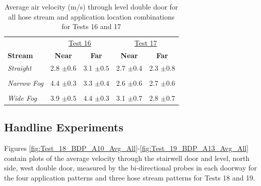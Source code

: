 \documentclass[12pt,oneside]{book}
\begin{document}
\begin{table}[!ht]
\caption{Average air velocity (m/s) through  level double door for all hose stream and application location combinations for Tests 16 and 17}
\begin{tabular}{lcccc}
\toprule
 & \multicolumn{2}{c}{\underline{Test 16}} & \multicolumn{2}{c}{\underline{Test 17}}
\\
\textbf{Stream} & \textbf{Near} & \textbf{Far} & \textbf{Near} & \textbf{Far} \\
\midrule
\textit{Straight} & 
2.8 $\pm 0.6$ & 3.1 $\pm 0.5$ & 
2.7 $\pm 0.4$ & 2.3 $\pm 0.8$
\\	\multicolumn{5}{c}{}	\\
\textit{Narrow Fog} & 
4.4 $\pm 0.3$ & 3.3 $\pm 0.4$ & 
2.6 $\pm 0.6$ & 2.7 $\pm 0.6$
\\	\multicolumn{5}{c}{}	\\
\textit{Wide Fog} 	& 
3.9 $\pm 0.5$ & 4.4 $\pm 0.3$ & 
3.1 $\pm 0.7$ & 2.8 $\pm 0.7$ 
\\ 
\bottomrule
\end{tabular}
\label{table:Tests_16_17_BDP_A13_Avgs}
\end{table}


\subsection{Handline Experiments}

Figures \ref{fig:Test_18_BDP_A10_Avg_All}-\ref{fig:Test_19_BDP_A13_Avg_All} contain plots of the average velocity through the stairwell door and  level, north side, west double door, measured by the bi-directional probes in each doorway for the four application patterns and three hose stream patterns for Tests 18 and 19. 
\end{document}
